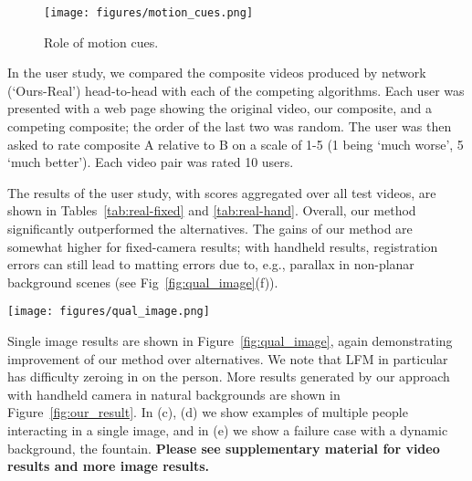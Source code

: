 \documentclass[10pt,twocolumn,letterpaper]{article}
\begin{document}
\begin{figure}[ht!]
	\centering
	\texttt{[image: figures/motion\_cues.png]}    \vspace{-0.5em}
	\caption{\small Role of motion cues.}
	\vspace{-1em}
	\label{fig:motion_cues}
\end{figure}





In the user study, we compared the composite videos produced by  network (`Ours-Real') head-to-head with each of the competing algorithms.  Each user was presented with a web page showing the original video, our composite, and a competing composite; the order of the last two was random.  The user was then asked to rate composite A relative to B on a scale of 1-5 (1 being `much worse', 5 `much better').  Each video pair was rated  10 users.



The results of the user study, with scores aggregated over all test videos, are shown in Tables~\ref{tab:real-fixed} and \ref{tab:real-hand}. Overall, our method significantly outperformed the alternatives.  The gains of our method are somewhat higher for fixed-camera results; with handheld results, registration errors can still lead to matting errors due to, e.g., parallax in non-planar background scenes (see Fig~\ref{fig:qual_image}(f)).


\begin{figure*}[!ht]
	\centering
	\texttt{[image: figures/qual\_image.png]}    \vspace{-.2cm}
	\caption{\small Comparison of matting methods with camera fixed (a,b,c) and handheld (d,e,f). Our method fails in (f) due to misregistration.} 
	\vspace{-1em}
	\label{fig:qual_image}
\end{figure*}

Single image results are shown in Figure~\ref{fig:qual_image}, again demonstrating improvement of our method over alternatives.  We note that LFM in particular has difficulty zeroing in on the person.  More results generated by our approach with handheld camera in natural backgrounds are shown in Figure~\ref{fig:our_result}. In (c), (d) we show examples of multiple people interacting in a single image, and in (e) we show a failure case with a dynamic background, the fountain. \textbf{Please see supplementary material for video results and more image results.}
\end{document}
